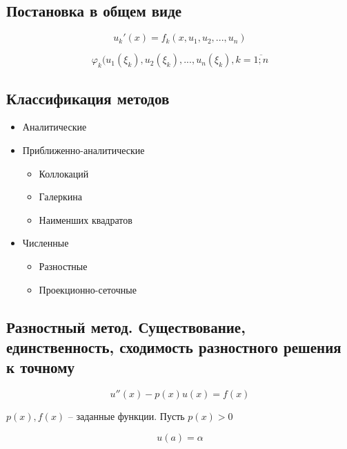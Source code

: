 \subsection{Постановка в общем виде}

\begin{equation*}
    u_k'(x) = f_k (x, u_1, u_2, ..., u_n)
\end{equation*}

\begin{equation*}
    \varphi_k(u_1(\xi_k), u_2(\xi_k),...,u_n(\xi_k), k = \overline{1;n}
\end{equation*}

\subsection{Классификация методов}

\begin{itemize}
    \item Аналитические
    \item Приближенно-аналитические

        \begin{itemize}
            \item Коллокаций
            \item Галеркина
            \item Наименших квадратов
        \end{itemize}

    \item Численные

        \begin{itemize}
            \item Разностные
            \item Проекционно-сеточные
        \end{itemize}
\end{itemize}

\subsection{Разностный метод. Существование, единственность, сходимость
разностного решения к точному}

\begin{equation*}
    u''(x) - p(x)u(x) = f(x)
\end{equation*}

$p(x), f(x)$ -- заданные функции. Пусть $p(x) > 0$

\begin{equation*}
    u(a) = \alpha
\end{equation*}

